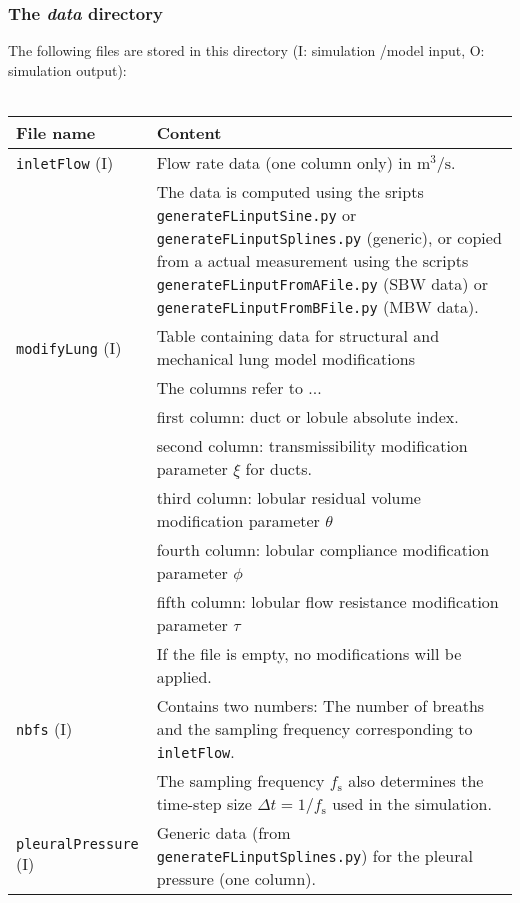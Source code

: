 \subsubsection{The \textit{data} directory}
The following files are stored in this directory (I: simulation /model input, O: simulation output):
\\ \\
\begin{tabular}{L{0.25\textwidth} L{0.75\textwidth}}
  \toprule
  File name      & Content \\
  \midrule
  \midrule
  \texttt{inletFlow} (I)  & Flow rate data (one column only) in $\mathrm{m^3}/\mathrm{s}$. \\
                          & The data is computed using the sripts \texttt{generateFLinputSine.py} or \texttt{generateFLinputSplines.py} (generic), or copied from a actual measurement using the scripts \texttt{generateFLinputFromAFile.py} (SBW data) or \texttt{generateFLinputFromBFile.py} (MBW data). \\
  \midrule
  \texttt{modifyLung} (I) & Table containing data for structural and mechanical lung model modifications \\
                          & The columns refer to ...\\
                          & first column: duct or lobule absolute index.\\
                          & second column: transmissibility modification parameter $\xi$ for ducts.\\
                          & third column: lobular residual volume modification parameter $\theta$\\
                          & fourth column: lobular compliance modification parameter $\phi$\\
                          & fifth column: lobular flow resistance modification parameter $\tau$\\
                          & If the file is empty, no modifications will be applied. \\
  \midrule
  \texttt{nbfs} (I)       & Contains two numbers: The number of breaths and the sampling frequency corresponding to \texttt{inletFlow}. \\
                          & The sampling frequency $f_\mathrm{s}$ also determines the time-step size $\Delta t = 1/f_\mathrm{s}$ used in the simulation. \\
  \midrule
  \texttt{pleuralPressure} (I) & Generic data (from \texttt{generateFLinputSplines.py}) for the pleural pressure (one column). \\

\end{tabular}
